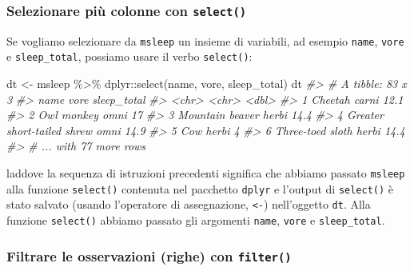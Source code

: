 \documentclass[
  10pt,
  italian,
  a4paper,
  extrafontsizes,onecolumn,openright
  ]{memoir}
\newenvironment{Shaded}{\begin{snugshade}}{\end{snugshade}}
\newcommand{\CommentTok}[1]{\textcolor[rgb]{0.56,0.35,0.01}{\textit{#1}}}
\newcommand{\FunctionTok}[1]{\textcolor[rgb]{0.00,0.00,0.00}{#1}}
\newcommand{\NormalTok}[1]{#1}
\newcommand{\OtherTok}[1]{\textcolor[rgb]{0.56,0.35,0.01}{#1}}
\newcommand{\SpecialCharTok}[1]{\textcolor[rgb]{0.00,0.00,0.00}{#1}}
\begin{document}
\hypertarget{selezionare-piuxf9-colonne-con-select}{%
\subsubsection{\texorpdfstring{Selezionare più colonne con \texttt{select()}}{Selezionare più colonne con select()}}\label{selezionare-piuxf9-colonne-con-select}}

Se vogliamo selezionare da \texttt{msleep} un insieme di variabili, ad esempio \texttt{name}, \texttt{vore} e \texttt{sleep\_total}, possiamo usare il verbo \texttt{select()}:

\begin{Shaded}
\begin{Highlighting}[]
\NormalTok{dt }\OtherTok{\textless{}{-}}\NormalTok{ msleep }\SpecialCharTok{\%\textgreater{}\%}
\NormalTok{  dplyr}\SpecialCharTok{::}\FunctionTok{select}\NormalTok{(name, vore, sleep\_total)}
\NormalTok{dt}
\CommentTok{\#\textgreater{} \# A tibble: 83 x 3}
\CommentTok{\#\textgreater{}   name                       vore  sleep\_total}
\CommentTok{\#\textgreater{}   \textless{}chr\textgreater{}                      \textless{}chr\textgreater{}       \textless{}dbl\textgreater{}}
\CommentTok{\#\textgreater{} 1 Cheetah                    carni        12.1}
\CommentTok{\#\textgreater{} 2 Owl monkey                 omni         17  }
\CommentTok{\#\textgreater{} 3 Mountain beaver            herbi        14.4}
\CommentTok{\#\textgreater{} 4 Greater short{-}tailed shrew omni         14.9}
\CommentTok{\#\textgreater{} 5 Cow                        herbi         4  }
\CommentTok{\#\textgreater{} 6 Three{-}toed sloth           herbi        14.4}
\CommentTok{\#\textgreater{} \# ... with 77 more rows}
\end{Highlighting}
\end{Shaded}

\noindent
laddove la sequenza di istruzioni precedenti significa che abbiamo passato \texttt{msleep} alla funzione \texttt{select()} contenuta nel pacchetto \texttt{dplyr} e l'output di \texttt{select()} è stato salvato (usando l'operatore di assegnazione, \texttt{\textless{}-}) nell'oggetto \texttt{dt}. Alla funzione \texttt{select()} abbiamo passato gli argomenti \texttt{name}, \texttt{vore} e \texttt{sleep\_total}.

\hypertarget{filtrare-le-osservazioni-righe-con-filter}{%
\subsubsection{\texorpdfstring{Filtrare le osservazioni (righe) con \texttt{filter()}}{Filtrare le osservazioni (righe) con filter()}}\label{filtrare-le-osservazioni-righe-con-filter}}
\end{document}
